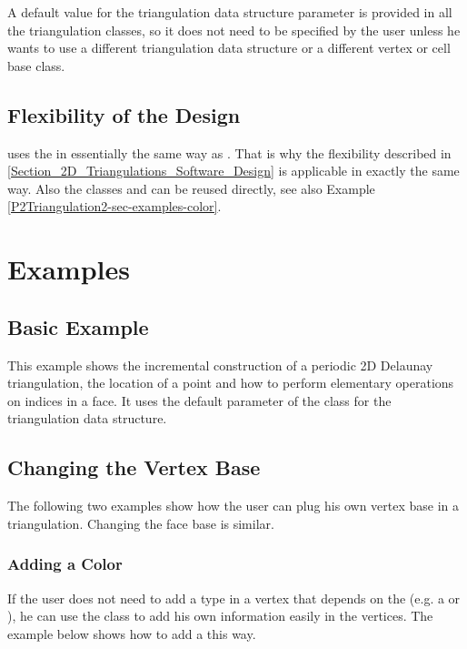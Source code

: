A default value for the triangulation data structure parameter is provided in
all the triangulation classes, so it does not need to be specified by
the user unless he wants to use a different triangulation data
structure or a different vertex or cell base class.

\subsection{Flexibility of the Design}
 uses the
 in essentially the same way as
. That is why the flexibility described in
\ref{Section_2D_Triangulations_Software_Design} is applicable in exactly the same
way. Also the classes  and
 can be reused directly, see
also Example \ref{P2Triangulation2-sec-examples-color}.

\section{Examples\label{P2Triangulation2-sec-examples}}
\subsection{Basic Example}
This example shows the incremental construction of a periodic 2D
Delaunay triangulation, the location of a point and how to perform
elementary operations on indices in a face. It uses the default
parameter of the  class for
the triangulation data structure.


\subsection{Changing the Vertex Base}
The following two examples show how the user can plug his own vertex
base in a triangulation. Changing the face base is similar.

\subsubsection{Adding a Color\label{P2Triangulation2-sec-examples-color}}
If the user does not need to add a type in a vertex that depends on
the  (e.g. a  or
), he can use the
 class to add his own
information easily in the vertices.  The example below shows how to
add a  this way.

